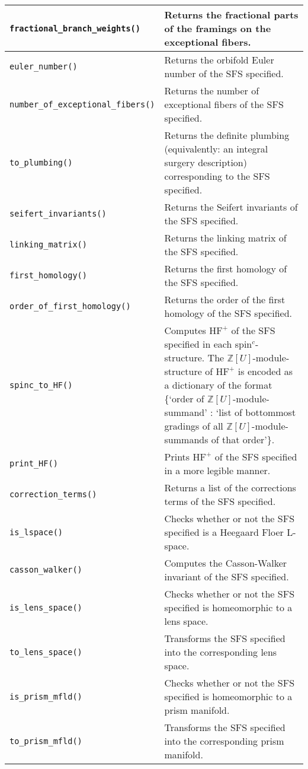 \documentclass[12pt]{amsart}
\theoremstyle{definition}
\theoremstyle{remark}
\numberwithin{equation}{section}
\newcommand{\hfp}{\mathrm{HF}^{+}}
\newcommand{\Z}{\mathbb{Z}}
\begin{document}
\renewcommand{\arraystretch}{1.5}%
\begin{tabularx}{\linewidth}{X X}\\
\hline
\texttt{fractional\_branch\_weights()} & Returns the fractional parts of the framings on the exceptional fibers.\\
\hline
\texttt{euler\_number()} & Returns the orbifold Euler number of the SFS specified.\\
\hline
\texttt{number\_of\_exceptional\_fibers()} & Returns the number of exceptional fibers of the SFS specified.\\
\hline
\texttt{to\_plumbing()} & Returns the definite plumbing (equivalently: an integral surgery description) corresponding to the SFS specified.\\
\hline
\texttt{seifert\_invariants()} & Returns the Seifert invariants of the SFS specified.\\
\hline
\texttt{linking\_matrix()} & Returns the linking matrix of the SFS specified.\\
\hline
\texttt{first\_homology()} & Returns the first homology of the SFS specified.\\
\hline
\texttt{order\_of\_first\_homology()} & Returns the order of the first homology of the SFS specified.\\
\hline
\texttt{spinc\_to\_HF()} & Computes $\hfp$ of the SFS specified in each spin$^c$-structure. The $\Z[U]$-module-structure of $\hfp$ is encoded as a dictionary of the format \{`order of $\Z[U]$-module-summand' : `list of bottommost gradings of all $\Z[U]$-module-summands of that order'\}.\\
\hline
\texttt{print\_HF()} & Prints $\hfp$ of the SFS specified in a more legible manner.\\
\hline
\texttt{correction\_terms()} & Returns a list of the corrections terms of the SFS specified.\\
\hline
\texttt{is\_lspace()} & Checks whether or not the SFS specified is a Heegaard Floer L-space.\\
\hline
\texttt{casson\_walker()} & Computes the Casson-Walker invariant of the SFS specified.\\
\hline
\texttt{is\_lens\_space()} & Checks whether or not the SFS specified is homeomorphic to a lens space.\\
\hline
\texttt{to\_lens\_space()} & Transforms the SFS specified into the corresponding lens space.\\
\hline
\texttt{is\_prism\_mfld()} & Checks whether or not the SFS specified is homeomorphic to a prism manifold.\\
\hline
\texttt{to\_prism\_mfld()} & Transforms the SFS specified into the corresponding prism manifold.\\
\hline
\end{tabularx}
\end{document}
